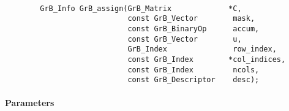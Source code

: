 \paragraph{\syntax}

\begin{verbatim}
        GrB_Info GrB_assign(GrB_Matrix             *C,
                            const GrB_Vector        mask,
                            const GrB_BinaryOp      accum,
                            const GrB_Vector        u,
                            GrB_Index               row_index,
                            const GrB_Index        *col_indices,
                            const GrB_Index         ncols,
                            const GrB_Descriptor    desc); 
\end{verbatim}

\paragraph{Parameters}

